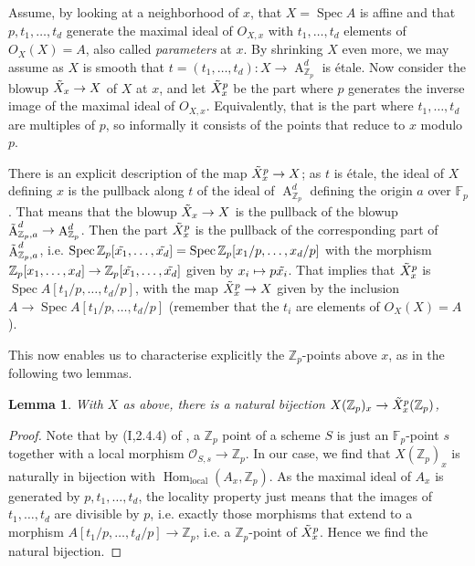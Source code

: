 \documentclass[12pt]{article}
\newcommand{\Z}{\mathbb{Z}}
\renewcommand{\O}{\mathcal{O}}
\newcommand{\F}{\mathbb{F}}
\DeclareMathOperator{\Hom}{Hom}
\DeclareMathOperator{\Spec}{Spec}
\DeclareMathOperator{\A}{A}
\theoremstyle{plain}
\newtheorem{lem}[thm]{Lemma} %
\theoremstyle{definition}
\theoremstyle{remark}
\begin{document}
Assume, by looking at a neighborhood of $x$, that $X = \Spec A$ is affine and that $p,t_1,\dots,t_d$ generate the maximal ideal of $O_{X,x}$ with $t_1,\dots,t_d$ elements of $O_X(X) = A$, also called \textit{parameters} at $x$. By shrinking $X$ even more, we may assume as $X$ is smooth that $t = (t_1,\dots,t_d): X \to \A^d_{\Z_p}$ is \'etale. Now consider the blowup $\Tilde{X}_x \to X$ of $X$ at $x$, and let $\Tilde{X}_x^p$ be the part where $p$ generates the inverse image of the maximal ideal of $O_{X,x}$. Equivalently, that is the part where $t_1,\dots,t_d$ are multiples of $p$, so informally it consists of the points that reduce to $x$ modulo $p$.

There is an explicit description of the map $\Tilde{X}_x^p \to X$; as $t$ is \'etale, the ideal of $X$ defining $x$ is the pullback along $t$ of the ideal of $\A^d_{\Z_p}$ defining the origin $a$ over $\F_p$. That means that the blowup $\Tilde{X}_x \to X$ is the pullback of the blowup $\Tilde{\A}^d_{\Z_p,a} \to \A_{\Z_p}^d$. Then the part $\Tilde{X}_x^p$ is the pullback of the corresponding part of $\Tilde{\A}^d_{\Z_p,a}$, i.e. $\Spec \Z_p[\Tilde{x_1},\dots,\Tilde{x_d}] = \Spec \Z_p[x_1/p,\dots,x_d/p]$ with the morphism $\Z_p[x_1,\dots,x_d] \to \Z_p[\Tilde{x_1},\dots,\tilde{x_d}]$ given by $x_i \mapsto p\Tilde{x_i}$. That implies that $\Tilde{X}_x^p$ is $\Spec A[t_1/p,\dots,t_d/p]$, with the map $\Tilde{X}_x^p \to X$ given by the inclusion $A \to \Spec A[t_1/p,\dots,t_d/p]$ (remember that the $t_i$ are elements of $O_X(X) = A$).

This now enables us to characterise explicitly the $\Z_p$-points above $x$, as in the following two lemmas.

\begin{lem}
With $X$ as above, there is a natural bijection $X(\Z_p)_x \to \Tilde{X}_x^p(\Z_p)$,
\end{lem}
\begin{proof}
Note that by (I,2.4.4) of \cite{ega}, a $\Z_p$ point of a scheme $S$ is just an $\F_p$-point $s$ together with a local morphism $\O_{S,s} \to \Z_p$. In our case, we find that $X(\Z_p)_x$ is naturally in bijection with $\Hom_{\text{local}}(A_x,\Z_p)$. As the maximal ideal of $A_x$ is generated by $p,t_1,\dots,t_d$, the locality property just means that the images of $t_1,\dots,t_d$ are divisible by $p$, i.e. exactly those morphisms that extend to a morphism $A[t_1/p,\dots,t_d/p] \to \Z_p$, i.e. a $\Z_p$-point of $\Tilde{X}_x^p$. Hence we find the natural bijection.
\end{proof}
\end{document}
